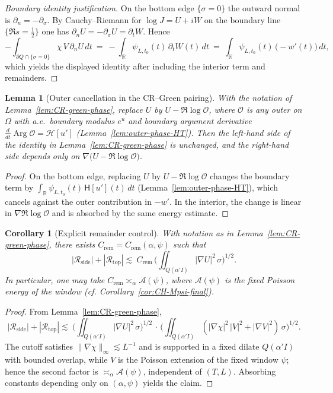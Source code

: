 \documentclass[11pt]{article}
\newcommand{\Hilb}{\mathcal H}
\newtheorem{lemma}[theorem]{Lemma}
\newtheorem{corollary}[theorem]{Corollary}
\theoremstyle{definition}
\theoremstyle{remark}
\theoremstyle{definition}
\newcommand{\R}{\mathbb{R}}
\DeclareMathOperator{\Arg}{Arg}
\begin{document}
\begin{proof}[Boundary identity justification]
On the bottom edge $\{\sigma=0\}$ the outward normal is $\partial_n=-\partial_\sigma$. By Cauchy–Riemann for $\log J=U+iW$ on the boundary line $\{\Re s=\tfrac12\}$ one has $\partial_n U=-\partial_\sigma U=\partial_t W$. Hence
\[
-\int_{\partial Q\cap\{\sigma=0\}} \chi\,V\,\partial_n U\,dt\ =\ -\int_{\R} \psi_{L,t_0}(t)\,\partial_t W(t)\,dt\ =\ \int_{\R} \psi_{L,t_0}(t)\,\big(-w'(t)\big)\,dt,
\]
which yields the displayed identity after including the interior term and remainders.
\end{proof}
\begin{lemma}[Outer cancellation in the CR--Green pairing]\label{lem:outer-cancel}
With the notation of Lemma~\ref{lem:CR-green-phase}, replace $U$ by $U-\Re\log\mathcal O$, where $\mathcal O$ is any outer on $\Omega$ with a.e.\ boundary modulus $e^{u}$ and boundary argument derivative $\frac{d}{dt}\Arg\mathcal O=\Hilb[u']$ (Lemma~\ref{lem:outer-phase-HT}). Then the left-hand side of the identity in Lemma~\ref{lem:CR-green-phase} is unchanged, and the right-hand side depends only on $\nabla\!\big(U-\Re\log\mathcal O\big)$.
\end{lemma}
\begin{proof}
On the bottom edge, replacing $U$ by $U-\Re\log\mathcal O$ changes the boundary term by $\int_{\R}\psi_{L,t_0}(t)\,\mathsf H[u'](t)\,dt$ (Lemma~\ref{lem:outer-phase-HT}), which cancels against the outer contribution in $-w'$. In the interior, the change is linear in $\nabla\Re\log\mathcal O$ and is absorbed by the same energy estimate.
\end{proof}
\begin{corollary}[Explicit remainder control]
With notation as in Lemma~\ref{lem:CR-green-phase}, there exists $C_{\mathrm{rem}}=C_{\mathrm{rem}}(\alpha,\psi)$ such that
\[
  |\mathcal R_{\mathrm{side}}|+|\mathcal R_{\mathrm{top}}|
 \lesssim\ C_{\mathrm{rem}}\,\Big(\iint_{Q(\alpha'I)} |\nabla U|^2\,\sigma\Big)^{1/2}.
\]
In particular, one may take $C_{\mathrm{rem}}\asymp_\alpha \mathcal A(\psi)$, where $\mathcal A(\psi)$ is the fixed Poisson energy of the window (cf. Corollary~\ref{cor:CH-Mpsi-final}).
\end{corollary}
\begin{proof}
From Lemma~\ref{lem:CR-green-phase},
\[
  |\mathcal R_{\mathrm{side}}|+|\mathcal R_{\mathrm{top}}| \lesssim\ \Big(\iint_{Q(\alpha'I)} |\nabla U|^2\,\sigma\Big)^{1/2}\,\cdot\,\Big(\iint_{Q(\alpha'I)} (|\nabla\chi|^2\,|V|^2+|\nabla V|^2)\,\sigma\Big)^{1/2}.
\]
The cutoff satisfies $\|\nabla\chi\|_\infty\lesssim L^{-1}$ and is supported in a fixed dilate $Q(\alpha' I)$ with bounded overlap, while $V$ is the Poisson extension of the fixed window $\psi$; hence the second factor is $\asymp_\alpha \mathcal A(\psi)$, independent of $(T,L)$. Absorbing constants depending only on $(\alpha,\psi)$ yields the claim.
\end{proof}
\end{document}
